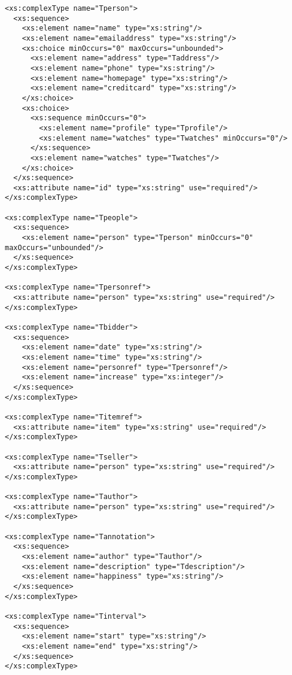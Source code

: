 \begin{lstlisting}[caption=Resulting XSD of Test Scenario B, frame=single, label=listing_xsd]
<xs:complexType name="Tperson">
  <xs:sequence>
    <xs:element name="name" type="xs:string"/>
    <xs:element name="emailaddress" type="xs:string"/>
    <xs:choice minOccurs="0" maxOccurs="unbounded">
      <xs:element name="address" type="Taddress"/>
      <xs:element name="phone" type="xs:string"/>
      <xs:element name="homepage" type="xs:string"/>
      <xs:element name="creditcard" type="xs:string"/>
    </xs:choice>
    <xs:choice>
      <xs:sequence minOccurs="0">
        <xs:element name="profile" type="Tprofile"/>
        <xs:element name="watches" type="Twatches" minOccurs="0"/>
      </xs:sequence>
      <xs:element name="watches" type="Twatches"/>
    </xs:choice>
  </xs:sequence>
  <xs:attribute name="id" type="xs:string" use="required"/>
</xs:complexType>

<xs:complexType name="Tpeople">
  <xs:sequence>
    <xs:element name="person" type="Tperson" minOccurs="0" maxOccurs="unbounded"/>
  </xs:sequence>
</xs:complexType>

<xs:complexType name="Tpersonref">
  <xs:attribute name="person" type="xs:string" use="required"/>
</xs:complexType>

<xs:complexType name="Tbidder">
  <xs:sequence>
    <xs:element name="date" type="xs:string"/>
    <xs:element name="time" type="xs:string"/>
    <xs:element name="personref" type="Tpersonref"/>
    <xs:element name="increase" type="xs:integer"/>
  </xs:sequence>
</xs:complexType>

<xs:complexType name="Titemref">
  <xs:attribute name="item" type="xs:string" use="required"/>
</xs:complexType>

<xs:complexType name="Tseller">
  <xs:attribute name="person" type="xs:string" use="required"/>
</xs:complexType>

<xs:complexType name="Tauthor">
  <xs:attribute name="person" type="xs:string" use="required"/>
</xs:complexType>

<xs:complexType name="Tannotation">
  <xs:sequence>
    <xs:element name="author" type="Tauthor"/>
    <xs:element name="description" type="Tdescription"/>
    <xs:element name="happiness" type="xs:string"/>
  </xs:sequence>
</xs:complexType>

<xs:complexType name="Tinterval">
  <xs:sequence>
    <xs:element name="start" type="xs:string"/>
    <xs:element name="end" type="xs:string"/>
  </xs:sequence>
</xs:complexType>


\end{lstlisting}
